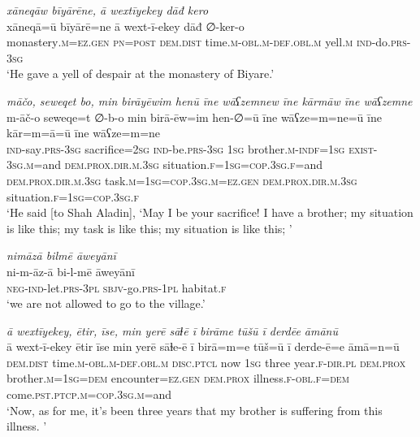 \ea \label{DG.33}
\textit{xāneqāw bīyārēne, ā wextīyekey dāđ kero} \\ 
\gll xāneqā=ū bīyārē=ne ā wext-ī-ekey dāđ ∅-ker-o \\ 
 monastery\textsc{.m}\textsc{=ez}\textsc{.gen} \textsc{pn}\textsc{=\textsc{post}} \textsc{dem.dist} time\textsc{.m}\textsc{-obl}\textsc{.m}\textsc{-def}\textsc{.obl}\textsc{.m} yell\textsc{.m} \textsc{ind-}do\textsc{.prs}\textsc{-3sg} \\ 
\glt `He gave a yell of despair at the monastery of Biyare.'
\z 
 
\ea \label{DG.34}
\textit{māčo, seweqet bo, min birāyēwim henū īne wāʕzemnew īne kārmāw īne wāʕzemne} \\ 
\gll m-āč-o seweqe=t ∅-b-o min birā-ēw=im hen-∅=ū īne wāʕze=m=ne=ū īne kār=m=ā=ū īne wāʕze=m=ne \\ 
 \textsc{ind-}say\textsc{.prs}\textsc{-3sg} sacrifice\textsc{=\textsc{2sg}} \textsc{ind-}be\textsc{.prs}\textsc{-3sg} \textsc{1sg} brother\textsc{.m}\textsc{-indf}\textsc{=1sg} \textsc{exist}\textsc{-3sg}\textsc{.m}=and \textsc{dem.prox}\textsc{.dir}\textsc{.m}\textsc{.3sg} situation\textsc{\textsc{.f}}\textsc{=1sg}\textsc{=\textsc{cop.3sg\textsc{.f}}}=and \textsc{dem.prox}\textsc{.dir}\textsc{.m}\textsc{.3sg} task\textsc{.m}\textsc{=1sg}\textsc{=cop}\textsc{.3sg}\textsc{.m}\textsc{=ez}\textsc{.gen} \textsc{dem.prox}\textsc{.dir}\textsc{.m}\textsc{.3sg} situation\textsc{\textsc{.f}}\textsc{=1sg}\textsc{=\textsc{cop.3sg\textsc{.f}}} \\ 
\glt `He said [to Shah Aladin], ‘May I be your sacrifice! I have a brother; my situation is like this; my task is like this; my situation is like this; '
\z 
 
\ea \label{DG.35}
\textit{nimāzā bilmē āweyānī} \\ 
\gll ni-m-āz-ā bi-l-mē āweyānī \\ 
 \textsc{neg-}\textsc{ind-}let\textsc{.prs}\textsc{-3pl} \textsc{sbjv-}go\textsc{.prs}\textsc{-1pl} habitat\textsc{\textsc{.f}} \\ 
\glt `we are not allowed to go to the village.'
\z 
 
\ea \label{DG.38}
\textit{ā wextīyekey, ētir, īse, min yerē sāɫē ī birāme tūšū ī derdēe āmānū} \\ 
\gll ā wext-ī-ekey ētir īse min yerē sāɫe-ē ī birā=m=e tūš=ū ī derde-ē=e āmā=n=ū \\ 
 \textsc{dem.dist} time\textsc{.m}\textsc{-obl}\textsc{.m}\textsc{-def}\textsc{.obl}\textsc{.m} \textsc{disc.ptcl} now \textsc{1sg} three year\textsc{\textsc{.f}}\textsc{-dir}\textsc{.pl} \textsc{dem.prox} brother\textsc{.m}\textsc{=1sg}\textsc{=dem} encounter\textsc{=ez}\textsc{.gen} \textsc{dem.prox} illness\textsc{\textsc{.f}}\textsc{-obl}\textsc{\textsc{.f}}\textsc{=dem} come\textsc{.pst}\textsc{.ptcp}\textsc{.m}\textsc{=cop}\textsc{.3sg}\textsc{.m}=and \\ 
\glt `Now, as for me, it’s been three years that my brother is suffering from this illness. '
\z 
 

